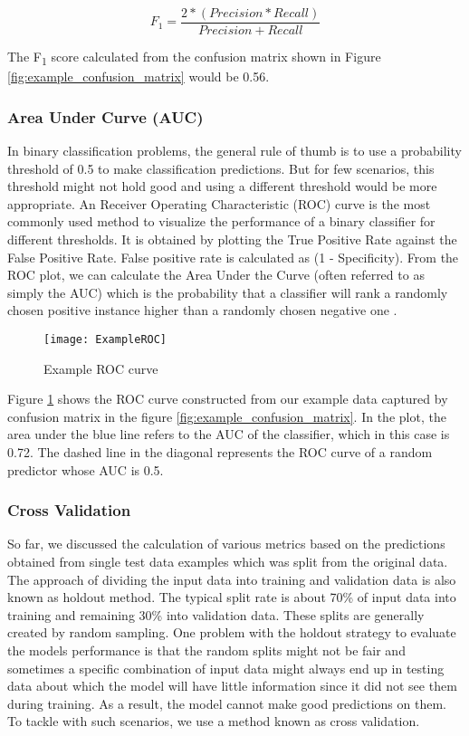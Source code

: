 \documentclass[11pt,openright]{report}
\begin{document}
\begin{equation}
F_{1} = \dfrac{2*(Precision * Recall) }{Precision + Recall} \label{eq:Precision} 
 \end{equation}

The F\textsubscript{1} score calculated from the confusion matrix shown in Figure \ref{fig:example_confusion_matrix} would be 0.56.


\subsubsection{Area Under Curve (AUC)}

In binary classification problems, the general rule of thumb is to use a probability threshold of 0.5 to make classification predictions. But for few scenarios, this threshold might not hold good and using a different threshold would be more appropriate. An Receiver Operating Characteristic (ROC) curve is the most commonly used method to visualize the performance of a binary classifier for different thresholds. It is obtained by plotting the True Positive Rate against the False Positive Rate. False positive rate is calculated as (1 - Specificity). From the ROC plot, we can calculate the Area Under the Curve (often referred to as simply the AUC) which is the probability that a classifier will rank a randomly chosen positive instance higher than a randomly chosen negative one \cite{fawcett2006introduction}.


  \begin{figure}[!htbp]
	\centering
	\texttt{[image: ExampleROC]}
	\caption{Example ROC curve}
	\label{fig:example_roc}
\end{figure} 

Figure \ref{fig:example_roc} shows the ROC curve constructed from our example data captured by confusion matrix in the figure \ref{fig:example_confusion_matrix}. In the plot, the area under the blue line refers to the AUC of the classifier, which in this case is 0.72. The dashed line in the diagonal represents the ROC curve of a random predictor whose AUC is 0.5.

\subsubsection{Cross Validation}
So far, we discussed the calculation of various metrics based on the predictions obtained from single test data examples which was split from the original data. The approach of dividing the input data into training and validation data is also known as holdout method. The typical split rate is about 70\% of input data into training and remaining 30\% into validation data. These splits are generally created by random sampling. One problem with the holdout strategy to evaluate the models performance is that the random splits might not be fair and sometimes a specific combination of input data might always end up in testing data about which the model will have little information since it did not see them during training. As a result, the model cannot make good predictions on them. To tackle with such scenarios, we use a method known as cross validation. 
\end{document}
